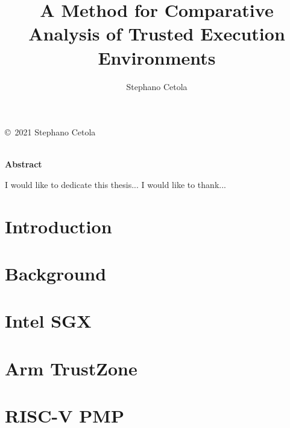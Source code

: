 \documentclass[12pt,oneside,letterpaper,hidelinks]{PSUreport}
\begin{document}
\title{A Method for Comparative Analysis of Trusted Execution Environments}
\subtitle{}
\author{Stephano Cetola}
\submitdate{\today}

\copyrightfalse
\figurespagetrue
\tablespagetrue
\beforepreface
{}
\null\vfill
\begin{center}
        \copyright\ 2021 Stephano Cetola \\
        \doclicenseLongText \\
        \vspace{5 mm}
        \doclicenseImage
\end{center}
\vfill\newpage
{}
\centerline{\textbf{Abstract}}

I would like to dedicate this thesis...
I would like to thank...
\afterpreface

\printglossary
\printglossary[type=\acronymtype]






\glsresetall
\chapter{Introduction}
\label{chap:intro}


\glsresetall
\chapter{Background}
\label{chap:bg}


\glsresetall
\chapter{Intel SGX}
\label{chap:sgx}


\glsresetall
\chapter{Arm TrustZone}
\label{chap:trustzone}


\glsresetall
\chapter{RISC-V PMP}
\label{chap:pmp}

\end{document}
